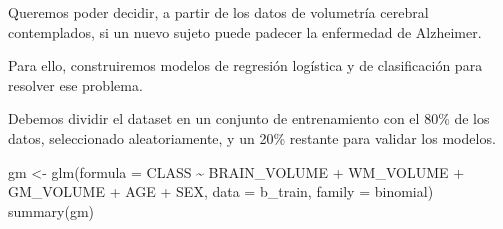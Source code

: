 \documentclass[
]{article}
\newenvironment{Shaded}{\begin{snugshade}}{\end{snugshade}}
\newcommand{\AttributeTok}[1]{\textcolor[rgb]{0.77,0.63,0.00}{#1}}
\newcommand{\ConstantTok}[1]{\textcolor[rgb]{0.00,0.00,0.00}{#1}}
\newcommand{\DecValTok}[1]{\textcolor[rgb]{0.00,0.00,0.81}{#1}}
\newcommand{\FunctionTok}[1]{\textcolor[rgb]{0.00,0.00,0.00}{#1}}
\newcommand{\NormalTok}[1]{#1}
\newcommand{\OtherTok}[1]{\textcolor[rgb]{0.56,0.35,0.01}{#1}}
\newcommand{\SpecialCharTok}[1]{\textcolor[rgb]{0.00,0.00,0.00}{#1}}
\begin{document}
Queremos poder decidir, a partir de los datos de volumetría cerebral
contemplados, si un nuevo sujeto puede padecer la enfermedad de
Alzheimer.

Para ello, construiremos modelos de regresión logística y de
clasificación para resolver ese problema.

Debemos dividir el dataset en un conjunto de entrenamiento con el 80\%
de los datos, seleccionado aleatoriamente, y un 20\% restante para
validar los modelos.

\begin{Shaded}
\end{Shaded}

\begin{Shaded}
\begin{Highlighting}[]
\NormalTok{gm }\OtherTok{\textless{}{-}} \FunctionTok{glm}\NormalTok{(}\AttributeTok{formula =}\NormalTok{ CLASS }\SpecialCharTok{\textasciitilde{}}\NormalTok{ BRAIN\_VOLUME  }\SpecialCharTok{+}\NormalTok{ WM\_VOLUME }\SpecialCharTok{+}\NormalTok{ GM\_VOLUME }\SpecialCharTok{+}\NormalTok{ AGE }\SpecialCharTok{+}\NormalTok{ SEX, }\AttributeTok{data =}\NormalTok{ b\_train, }\AttributeTok{family =}\NormalTok{ binomial)}
\FunctionTok{summary}\NormalTok{(gm)}
\end{Highlighting}
\end{Shaded}
\end{document}
